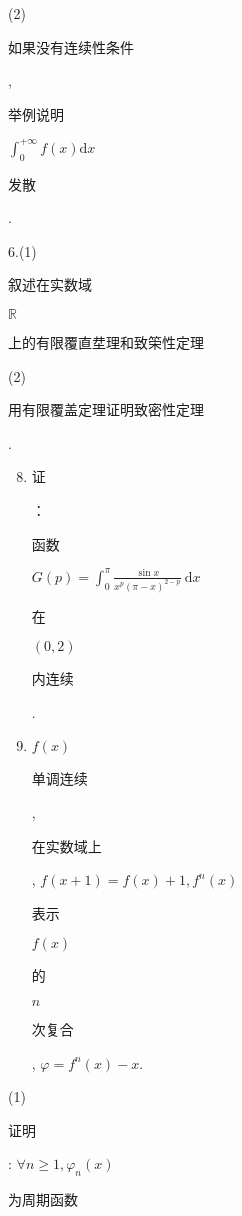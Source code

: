 \documentclass[10pt]{article}
\begin{document}
(2) \begin{CJK}{UTF8}{mj}如果没有连续性条件\end{CJK}, \begin{CJK}{UTF8}{mj}举例说明\end{CJK} $\int_{0}^{+\infty} f(x) \mathrm{d} x$ \begin{CJK}{UTF8}{mj}发散\end{CJK}.

6.(1) \begin{CJK}{UTF8}{mj}叙述在实数域\end{CJK} $\mathbb{R}$ \begin{CJK}{UTF8}{mj}上的有限覆直坓理和致筞性定理\end{CJK}

(2) \begin{CJK}{UTF8}{mj}用有限覆盖定理证明致密性定理\end{CJK}.

\begin{enumerate}
  \setcounter{enumi}{7}
  \item \begin{CJK}{UTF8}{mj}证\end{CJK}：\begin{CJK}{UTF8}{mj}函数\end{CJK} $G(p)=\int_{0}^{\pi} \frac{\sin x}{x^{p}(\pi-x)^{2-p}} \mathrm{~d} x$ \begin{CJK}{UTF8}{mj}在\end{CJK} $(0,2)$ \begin{CJK}{UTF8}{mj}内连续\end{CJK}.

  \item $f(x)$ \begin{CJK}{UTF8}{mj}单调连续\end{CJK}, \begin{CJK}{UTF8}{mj}在实数域上\end{CJK}, $f(x+1)=f(x)+1, f^{n}(x)$ \begin{CJK}{UTF8}{mj}表示\end{CJK} $f(x)$ \begin{CJK}{UTF8}{mj}的\end{CJK} $n$ \begin{CJK}{UTF8}{mj}次复合\end{CJK}, $\varphi=f^{n}(x)-x$.

\end{enumerate}
(1) \begin{CJK}{UTF8}{mj}证明\end{CJK}: $\forall n \geq 1, \varphi_{n}(x)$ \begin{CJK}{UTF8}{mj}为周期函数\end{CJK}
\end{document}
